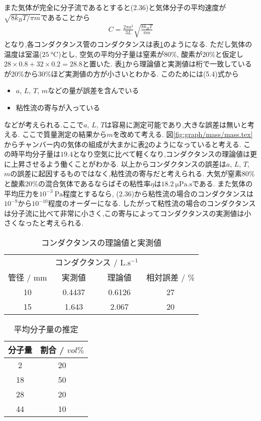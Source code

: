 また気体が完全に分子流であるとすると(2.36)と気体分子の平均速度が$\sqrt{8k_BT/\pi m}$であることから
\begin{align}
  C=\frac{2\pi a^3}{3L}\sqrt{\frac{8k_BT}{\pi m}}
\end{align}
となり,各コンダクタンス管のコンダクタンスは表\ref{tab:con_theo}のようになる.
ただし気体の温度は室温($25\ \si{\degreeCelsius}$)とし,
空気の平均分子量は窒素が$80\%$, 酸素が$20\%$と仮定し$28\times 0.8+32\times0.2=28.8$と置いた.
表\ref{tab:con_theo}から理論値と実測値は桁で一致しているが20\%から30\%ほど実測値の方が小さいとわかる.
このためには(5.4)式から
\begin{itemize}
  \item $a$, $L$, $T$, $m$などの量が誤差を含んでいる
  \item 粘性流の寄与が入っている
\end{itemize}
などが考えられる.ここで$a$, $L$, $T$は容易に測定可能であり,大きな誤差は無いと考える.
ここで質量測定の結果から$m$を改めて考える.
図\ref{fig:graph/mass/mass.tex}からチャンバー内の気体の組成が大まかに表\ref{tab:heikin}のようになっていると考える.
この時平均分子量は$19.4$となり空気に比べて軽くなり,コンダクタンスの理論値は更に上昇させるよう働くことがわかる.
以上からコンダクタンスの誤差は$a$, $L$, $T$, $m$の誤差に起因するものではなく,粘性流の寄与だと考えられる.
大気が窒素80\%と酸素20\%の混合気体であるならばその粘性率$\eta$は$18.2\ \si{\micro\pascal.\second}$である.\cite{kagakuNensei:online}
また気体の平均圧力を$10^{-3}\ \si{\pascal}$程度とするなら,
(2.36)から粘性流の場合のコンダクタンスは$10^{-9}$から$10^{-10}$程度のオーダーになる.
したがって粘性流の場合のコンダクタンスは分子流に比べて非常に小さく,この寄与によってコンダクタンスの実測値は小さくなったと考えられる.
\begin{table}[h]
\caption{コンダクタンスの理論値と実測値}
\label{tab:con_theo}
\centering
\begin{tabular}{c|ccc}
\hline
&\multicolumn{2}{c}{コンダクタンス / $\si{\liter.\second^{-1}}$}\\
管径 / $\si{\milli\metre}$&実測値&理論値&相対誤差 / \%\\
\hline \hline
10&0.4437 & 0.6126 & 27\\
15&1.643 & 2.067 & 20\\
\hline
\end{tabular}
\end{table}
\begin{table}[h]
  \caption{平均分子量の推定}
  \label{tab:heikin}
  \centering
  \begin{tabular}{cc}
  \hline
  分子量&割合 / $vol\%$\\
  \hline \hline
  2&20\\
  18&50\\
  28&20\\
  44&10\\
  \hline
  \end{tabular}
\end{table}
